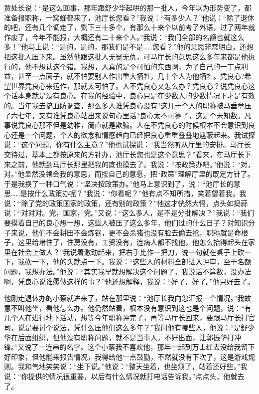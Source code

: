 \documentclass[12pt,oneside]{book}
\begin{document}
贾处长说：``是这么回事，那年跟舒少华起哄的那一批人，今年以为形势变了，都准备报职称，一窝蜂都来了，池厅长您看？''我说：``有多少人？''他说：``除了退休的吧，还有几个调走了，剩下三十多个，有那么十来个以前考了外语，过了两年就作废了，今年不能报，大概还有二十来个人。''我说：``我们全部的名额也就这么多！''他马上说：``是的，是的，那我们是不是\ldots\ldots 您看？''他的意思非常明白，还想把这批人压下来。虽然他跟这批人无冤无仇，可马厅长的意思这么多年来都是他执行的，他不想认这个错。我想，人真的是个可怕的东西啊，为了自己的一丁点利益，甚至一点面子，就不怕要别人作出重大牺牲，几十个人为他牺牲。凭良心?希望世界凭良心来运作，那就太可怕了。人不凭良心又怎么办？凭良心？说凭良心这个话本身就是没有良心。在我的经验中，良心只是在少数人的少数情况下才是有效的。当年我去搞血防调查，那么多人谁凭良心没有?这几十个人的职称被马垂章压了六七年，又有谁凭良心站出来说句心里话?良心太不可靠了，这是个未知数。凡事说凭良心那不但是幼稚，简直就是欺骗。人在不凭良心的时候根本不会意识到良心还是一个问题，个人的欲念和情感趋向已经把良心重重叠叠地遮蔽起来。我试探说：``这个问题，你有什么主意？''他也试探说：``我当然听从厅里的安排。马厅长交待过，基本上都按原来的方针办，池厅长您也是这个意思？''看来，在马厅长下来之前，他就到马厅长那里把我的底也摸去了。我说：``按政策办吧。''他说：``对，对。''他显然没领会我的意思，而按自己的意愿，把``政策''理解厅里的既定方针了。于是我换了一种口气说：``坚决按政策办。''他马上意识到了，说：``池厅长的意思\ldots\ldots 是按什么政策办呢？''我说：``你看呢？''他有点不知所措，笑着望着我。我说：``除了党的政策国家的政策，还有别的政策？''他这才恍然大悟，点头如捣蒜说：``对对对。党，国家，党。''又说：``这么多人，是不是分批解决？''我说：``我们要摸着自己的良心想一想，这些人被压了这么多年，他们过的什么日子？对知识分子来说，他们不会耕田不会炼钢，更不会杀猪也没有脸去偷去抢，职称就是命根子，这里给堵住了，住房没有，工资没有，连病人都不找他，他怎么抬得起头在家里在社会上做人？''我说着激动起来，把右手比作一把刀，说一句就在桌子上砍一下，我砍一下，他的头就点一下。我说：``这些人的材料全部进入评审，至于名额问题，我想办法。''他说：``其实我早就想解决这个问题了，我说话不算数，没办法啊，凭良心说谁愿做这样的事？''他还想解释，我说：``好了，好了。''他只好去了。

他刚走退休办的小蔡就进来了，站在那里说：``池厅长我向您汇报一个情况。''我故意不叫他坐，看他怎么办。他仍然站着，根本没有意识到这也是个问题，说：``有几个人在进行地下活动，想等今年职称评完了，再等马厅长回来，要跟马厅长打官司，说是要讨个说法，凭什么压他们这么多年？''我问他有哪些人，他说：``是舒少华在后面组织，但他没有职称问题，就不是当事人，不好出面，让郭振华打冲锋。''又说了一连串的名字。这个小蔡我不喜欢他，那年一起到万山红去没给我留下好印象，但他能来报告情况，我得给他一点鼓励，不然就没有下次了，这是游戏规则。我和气地笑笑说：``坐下说。''他说：``整天坐着，也坐烦了，站着还好些。''我说：``你提供的情况很重要，以后有什么情况就打电话告诉我。''点点头，他就去了。
\end{document}
